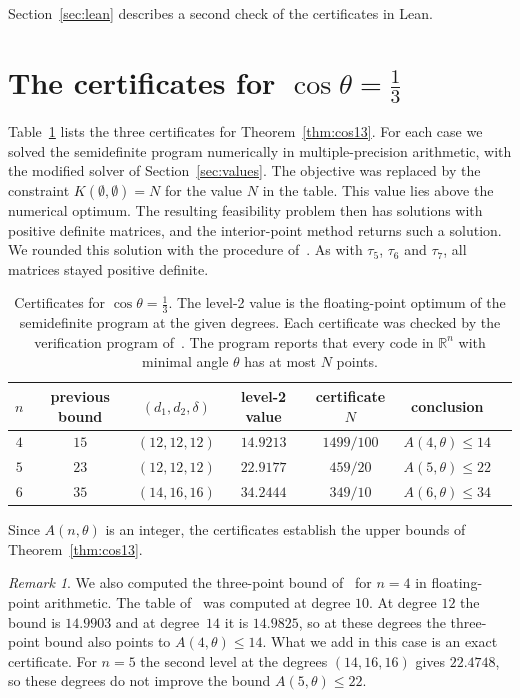 \documentclass[11pt]{amsart}
\theoremstyle{remark}
\newtheorem{remark}[theorem]{Remark}
\newcommand{\R}{\mathbb{R}}
\begin{document}
Section~\ref{sec:lean} describes a second check of the certificates in Lean.

\section{The certificates for \texorpdfstring{$\cos\theta=\frac13$}{cos theta = 1/3}}\label{sec:certificates}

Table~\ref{tab:cert} lists the three certificates for Theorem~\ref{thm:cos13}. For each case we solved the semidefinite program numerically in multiple-precision arithmetic, with the modified solver of Section~\ref{sec:values}. The objective was replaced by the constraint $K(\emptyset,\emptyset)=N$ for the value $N$ in the table. This value lies above the numerical optimum. The resulting feasibility problem then has solutions with positive definite matrices, and the interior-point method returns such a solution. We rounded this solution with the procedure of~\cite{CdLL}. As with $\tau_5$, $\tau_6$ and $\tau_7$, all matrices stayed positive definite.

\begin{table}[ht]
\centering
\begin{tabular}{ccccccc}
\toprule
$n$ & previous bound & $(d_1,d_2,\delta)$ & level-2 value & certificate $N$ & conclusion \\
\midrule
$4$ & $15$ & $(12,12,12)$ & $14.9213$ & $1499/100$ & $A(4,\theta)\le14$\\
$5$ & $23$ & $(12,12,12)$ & $22.9177$ & $459/20$ & $A(5,\theta)\le22$\\
$6$ & $35$ & $(14,16,16)$ & $34.2444$ & $349/10$ & $A(6,\theta)\le34$\\
\bottomrule
\end{tabular}
\medskip
\caption{Certificates for $\cos\theta=\frac13$. The level-2 value is the floating-point optimum of the semidefinite program at the given degrees. Each certificate was checked by the verification program of~\cite{LLM}. The program reports that every code in $\R^n$ with minimal angle $\theta$ has at most $N$ points.}\label{tab:cert}
\end{table}

Since $A(n,\theta)$ is an integer, the certificates establish the upper bounds of Theorem~\ref{thm:cos13}.

\begin{remark}
We also computed the three-point bound of~\cite{BV} for $n=4$ in floating-point arithmetic. The table of~\cite{BV} was computed at degree $10$. At degree $12$ the bound is $14.9903$ and at degree~$14$ it is $14.9825$, so at these degrees the three-point bound also points to $A(4,\theta)\le14$. What we add in this case is an exact certificate. For $n=5$ the second level at the degrees $(14,16,16)$ gives $22.4748$, so these degrees do not improve the bound $A(5,\theta)\le22$.
\end{remark}
\end{document}

